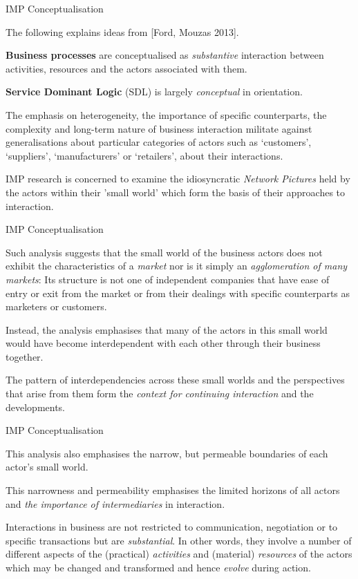 \documentclass{beamer}
\begin{document}
\begin{frame}{IMP Conceptualisation}

The following explains ideas from [Ford, Mouzas 2013].
  
\textbf{Business processes} are conceptualised as \emph{substantive}
interaction between activities, resources and the actors associated with them.

\textbf{Service Dominant Logic} (SDL) is largely \emph{conceptual} in
orientation.

The emphasis on heterogeneity, the importance of speciﬁc counterparts, the
complexity and long-term nature of business interaction militate against
generalisations about particular categories of actors such as ‘customers’,
‘suppliers’, ‘manufacturers’ or ‘retailers’, about their interactions.

IMP research is concerned to examine the idiosyncratic \emph{Network Pictures}
held by the actors within their 'small world' which form the basis of their
approaches to interaction.
\end{frame}

\begin{frame}{IMP Conceptualisation}

Such analysis suggests that the small world of the business actors does not
exhibit the characteristics of a \emph{market} nor is it simply an
\emph{agglomeration of many markets}: Its structure is not one of independent
companies that have ease of entry or exit from the market or from their
dealings with speciﬁc counterparts as marketers or customers.

Instead, the analysis emphasises that many of the actors in this small world
would have become interdependent with each other through their business
together.

The pattern of interdependencies across these small worlds and the
perspectives that arise from them form the \emph{context for continuing
  interaction} and the developments.

\end{frame}

\begin{frame}{IMP Conceptualisation}

This analysis also emphasises the narrow, but permeable boundaries of
each actor's small world.

This narrowness and permeability emphasises the limited horizons of all actors
and \emph{the importance of intermediaries} in interaction.

Interactions in business are not restricted to communication, negotiation or
to speciﬁc transactions but are \emph{substantial}. In other words, they
involve a number of different aspects of the (practical) \emph{activities} and
(material) \emph{resources} of the actors which may be changed and transformed
and hence \emph{evolve} during action. 
\end{frame}
\end{document}
